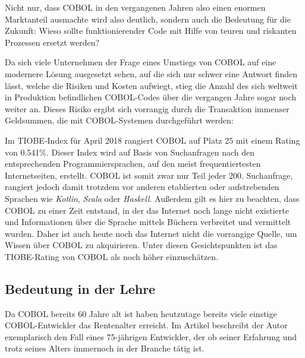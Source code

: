 Nicht nur, dass COBOL in den vergangenen Jahren also einen enormen Marktanteil ausmachte wird also deutlich, sondern auch die Bedeutung für die Zukunft: Wieso sollte funktionierender Code mit Hilfe von teuren und riskanten Prozessen ersetzt werden?

Da sich viele Unternehmen der Frage eines Umstiegs von COBOL auf eine modernere Lösung ausgesetzt sehen, auf die sich nur schwer eine Antwort finden lässt, welche die Risiken und Kosten aufwiegt, stieg die Anzahl  des sich weltweit in Produktion befindlichen COBOL-Codes über die vergangen Jahre sogar noch weiter an.
Dieses Risiko ergibt sich vorrangig durch die Transaktion immenser Geldsummen, die mit COBOL-Systemen durchgeführt werden:  \cite{beat_balzli_cobol-programmierer_2017}

Im TIOBE-Index\cite{_tiobe_} für April 2018 rangiert COBOL auf Platz 25 mit einem Rating von 0.541\%. Dieser Index wird auf Basis von Suchanfragen nach den entsprechenden Programmiersprachen, auf den meist frequentiertesten Internetseiten, erstellt. COBOL ist somit zwar nur Teil jeder 200. Suchanfrage, rangiert jedoch damit trotzdem vor anderen etablierten oder aufstrebenden Sprachen wie \textit{Kotlin}, \textit{Scala} oder \textit{Haskell}. Außerdem gilt es hier zu beachten, dass COBOL zu einer Zeit entstand, in der das Internet noch lange nicht existierte und Informationen über die Sprache mittels Büchern verbreitet und vermittelt wurden. Daher ist auch heute noch das Internet nicht die vorrangige Quelle, um Wissen über COBOL zu akquirieren. Unter diesen Gesichtspunkten ist das TIOBE-Rating von COBOL als noch höher einzuschätzen.


\subsection*{Bedeutung in der Lehre}
Da COBOL bereits 60 Jahre alt ist haben heutzutage bereits viele einstige COBOL-Entwickler das Rentenalter erreicht. Im Artikel  beschreibt der Autor exemplarisch den Fall eines 75-jährigen Entwickler, der ob seiner Erfahrung und trotz seines Alters immernoch in der Branche tätig ist.

